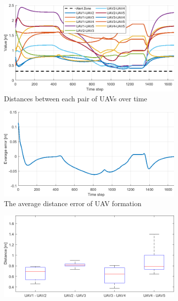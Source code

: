 \begin{figure}[t]
    \centering
    \begin{subfigure}[b]{0.495\textwidth}
    \includegraphics[width=\textwidth]{paper1/images/distance.png}
    \caption{Distances between each pair of UAVs over time}
    \label{fig:chap2_distance}
    \end{subfigure}
    \begin{subfigure}[b]{0.495\textwidth}
    \includegraphics[width=\textwidth]{paper1/images/error.png}
    \caption{The average distance error of UAV formation}
    \label{fig:chap2_error}
    \end{subfigure}
    \begin{subfigure}[b]{0.495\textwidth}
    \includegraphics[width=\textwidth]{paper1/images/mean.png}

\end{subfigure}
\end{figure}

